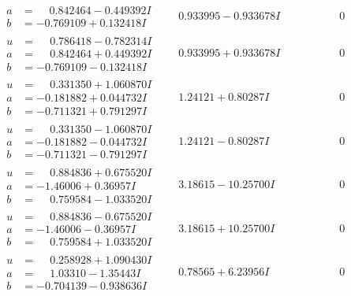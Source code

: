 \documentclass[1p]{elsarticle_modified}
\theoremstyle{definition}
\begin{document}
$$\begin{array}{c|c|c}
\begin{aligned}
a &= \phantom{-}0.842464 - 0.449392 I \\
b &= -0.769109 + 0.132418 I\end{aligned}
 & \phantom{-}0.933995 - 0.933678 I & \phantom{-0.000000 } 0 \\ \hline\begin{aligned}
u &= \phantom{-}0.786418 - 0.782314 I \\
a &= \phantom{-}0.842464 + 0.449392 I \\
b &= -0.769109 - 0.132418 I\end{aligned}
 & \phantom{-}0.933995 + 0.933678 I & \phantom{-0.000000 } 0 \\ \hline\begin{aligned}
u &= \phantom{-}0.331350 + 1.060870 I \\
a &= -0.181882 + 0.044732 I \\
b &= -0.711321 + 0.791297 I\end{aligned}
 & \phantom{-}1.24121 + 0.80287 I & \phantom{-0.000000 } 0 \\ \hline\begin{aligned}
u &= \phantom{-}0.331350 - 1.060870 I \\
a &= -0.181882 - 0.044732 I \\
b &= -0.711321 - 0.791297 I\end{aligned}
 & \phantom{-}1.24121 - 0.80287 I & \phantom{-0.000000 } 0 \\ \hline\begin{aligned}
u &= \phantom{-}0.884836 + 0.675520 I \\
a &= -1.46006 + 0.36957 I \\
b &= \phantom{-}0.759584 - 1.033520 I\end{aligned}
 & \phantom{-}3.18615 - 10.25700 I & \phantom{-0.000000 } 0 \\ \hline\begin{aligned}
u &= \phantom{-}0.884836 - 0.675520 I \\
a &= -1.46006 - 0.36957 I \\
b &= \phantom{-}0.759584 + 1.033520 I\end{aligned}
 & \phantom{-}3.18615 + 10.25700 I & \phantom{-0.000000 } 0 \\ \hline\begin{aligned}
u &= \phantom{-}0.258928 + 1.090430 I \\
a &= \phantom{-}1.03310 - 1.35443 I \\
b &= -0.704139 - 0.938636 I\end{aligned}
 & \phantom{-}0.78565 + 6.23956 I & \phantom{-0.000000 } 0 \\ \hline\begin{aligned}

\end{aligned}
\end{array}$$
\end{document}
